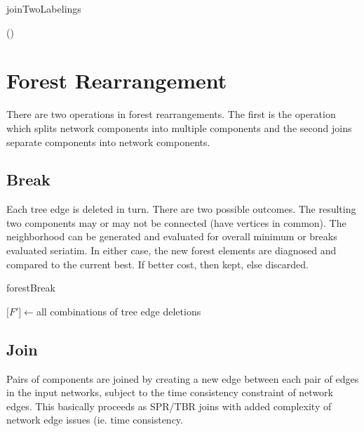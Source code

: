 \documentclass[11pt]{article}
\begin{document}
\begin{algorithm}
	\caption{joinTwoLabelings}
	\label{alg:joinTwo}
	\SetAlgoLined
		 {\Return ()} 			
	\end{algorithm}
 
 \section{Forest Rearrangement} \label{Forest Rearrangement}
 There are two operations in forest rearrangements.  The first is the operation which splits network components into
 multiple components and the second joins separate components into network components.
 
 \subsection{Break} \label{Break}
 Each tree edge is deleted in turn.  There are two possible outcomes.  The resulting two components
 may or may not be connected (have vertices in common).  The neighborhood can be generated and evaluated
 for overall minimum or breaks evaluated seriatim.   In either case, the new forest elements 
 are diagnosed and compared to the current best.  If better cost, then kept, else discarded.  
 
	\begin{algorithm}
		\caption{forestBreak}
		\label{alg:forestBreak}
		\SetAlgoLined
		$\lbrack F' \rbrack \leftarrow $all combinations of tree edge deletions\\
	\end{algorithm}

 \subsection{Join} \label{Join}
 Pairs of components are joined by creating a new edge between each pair of edges in the input networks,
 subject to the time consistency constraint of network edges.  This basically proceeds as SPR/TBR joins
 with added complexity of network edge issues (ie. time consistency. 
\end{document}
